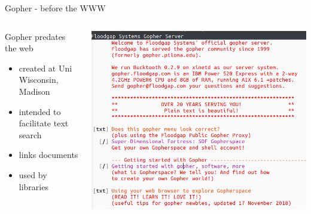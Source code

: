 \documentclass[presentation, 11pt,  aspectratio=169]{beamer}
\begin{document}
\begin{frame}[label={sec:orgb0d32ef}]{Gopher - before the WWW}
\begin{columns}
\begin{column}{0.3\columnwidth}
\begin{block}{Gopher predates the web}
\begin{itemize}
\item created at Uni Wisconsin, Madison\\
\item intended to facilitate text search\\
\item links documents\\
\item used by libraries\\
\end{itemize}
\end{block}
\end{column}

\begin{column}{0.70\columnwidth}
\begin{center}
\includegraphics[height=0.85\textheight]{images/Gopher-1.png}
\end{center}
\end{column}
\end{columns}
\end{frame}
\end{document}
